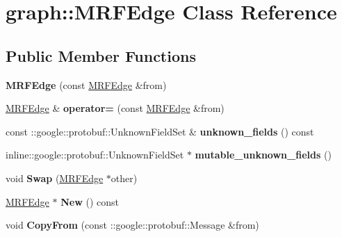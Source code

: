 \hypertarget{classgraph_1_1MRFEdge}{
\section{graph::MRFEdge Class Reference}
\label{classgraph_1_1MRFEdge}
}
\subsection*{Public Member Functions}
\begin{DoxyCompactItemize}
\item 
\hypertarget{classgraph_1_1MRFEdge_aa09de56220ba0cb66c9fd9228ba4d221}{
{\bfseries MRFEdge} (const \hyperlink{classgraph_1_1MRFEdge}{MRFEdge} \&from)}
\label{classgraph_1_1MRFEdge_aa09de56220ba0cb66c9fd9228ba4d221}

\item 
\hypertarget{classgraph_1_1MRFEdge_a3b97945487b8335d0a845629dd61aa9a}{
\hyperlink{classgraph_1_1MRFEdge}{MRFEdge} \& {\bfseries operator=} (const \hyperlink{classgraph_1_1MRFEdge}{MRFEdge} \&from)}
\label{classgraph_1_1MRFEdge_a3b97945487b8335d0a845629dd61aa9a}

\item 
\hypertarget{classgraph_1_1MRFEdge_a291edbf56dd75cfc07882c224d78f6f2}{
const ::google::protobuf::UnknownFieldSet \& {\bfseries unknown\_\-fields} () const }
\label{classgraph_1_1MRFEdge_a291edbf56dd75cfc07882c224d78f6f2}

\item 
\hypertarget{classgraph_1_1MRFEdge_aaf28e2100240ef4b97bff1970da1bbae}{
inline::google::protobuf::UnknownFieldSet $\ast$ {\bfseries mutable\_\-unknown\_\-fields} ()}
\label{classgraph_1_1MRFEdge_aaf28e2100240ef4b97bff1970da1bbae}

\item 
\hypertarget{classgraph_1_1MRFEdge_afded0d8d16e77ef81e494cbdad220734}{
void {\bfseries Swap} (\hyperlink{classgraph_1_1MRFEdge}{MRFEdge} $\ast$other)}
\label{classgraph_1_1MRFEdge_afded0d8d16e77ef81e494cbdad220734}

\item 
\hypertarget{classgraph_1_1MRFEdge_a21211c0e2ad05324c09d90c86b5ba34e}{
\hyperlink{classgraph_1_1MRFEdge}{MRFEdge} $\ast$ {\bfseries New} () const }
\label{classgraph_1_1MRFEdge_a21211c0e2ad05324c09d90c86b5ba34e}

\item 
\hypertarget{classgraph_1_1MRFEdge_a65ec5aa99bae52421400d4b456955ce6}{
void {\bfseries CopyFrom} (const ::google::protobuf::Message \&from)}
\label{classgraph_1_1MRFEdge_a65ec5aa99bae52421400d4b456955ce6}


\end{DoxyCompactItemize}
